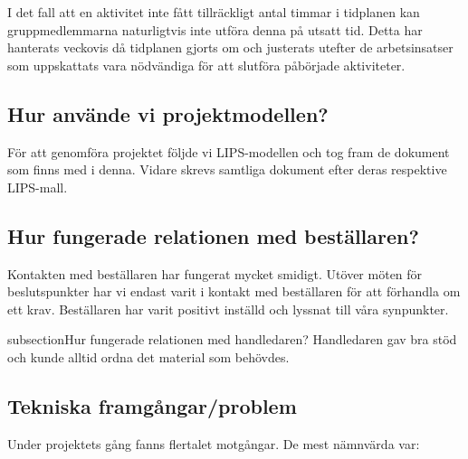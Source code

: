 \documentclass[a4paper,12pt]{article}
\begin{document}
I det fall att en aktivitet inte fått tillräckligt antal timmar i tidplanen kan gruppmedlemmarna naturligtvis inte utföra denna på utsatt tid. Detta har hanterats veckovis då tidplanen gjorts om och justerats utefter de arbetsinsatser som uppskattats vara nödvändiga för att slutföra påbörjade aktiviteter.

\subsection{Hur använde vi projektmodellen?}
För att genomföra projektet följde vi LIPS-modellen och tog fram de dokument som finns med i denna. Vidare skrevs samtliga dokument efter deras respektive LIPS-mall. 

\subsection{Hur fungerade relationen med beställaren?}
Kontakten med beställaren har fungerat mycket smidigt. Utöver möten för beslutspunkter har vi endast varit i kontakt med beställaren för att förhandla om ett krav. Beställaren har varit positivt inställd och lyssnat till våra synpunkter.

subsection{Hur fungerade relationen med handledaren?}
Handledaren gav bra stöd och kunde alltid ordna det material som behövdes.

\subsection{Tekniska framgångar/problem}
Under projektets gång fanns flertalet motgångar. De mest nämnvärda var:
\end{document}
